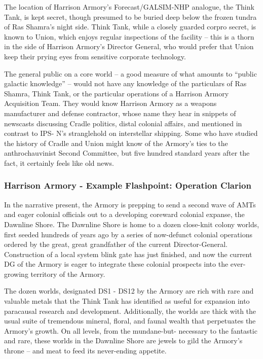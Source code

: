 The location of Harrison Armory’s Forecast/GALSIM-NHP analogue, the Think Tank, is kept
secret, though presumed to be buried deep below the frozen tundra of Ras Shamra’s night side.
Think Tank, while a closely guarded corpro secret, is known to Union, which enjoys regular
inspections of the facility -- this is a thorn in the side of Harrison Armory’s Director General, who
would prefer that Union keep their prying eyes from sensitive corporate technology.

The general public on a core world -- a good measure of what amounts to “public galactic
knowledge” -- would not have any knowledge of the particulars of Ras Shamra, Think Tank, or
the particular operations of a Harrison Armory Acquisition Team. They would know Harrison
Armory as a weapons manufacturer and defense contractor, whose name they hear in snippets
of newscasts discussing Cradle politics, distal colonial affairs, and mentioned in contrast to IPS-
N’s stranglehold on interstellar shipping. Some who have studied the history of Cradle and Union
might know of the Armory’s ties to the anthrochauvinist Second Committee, but five hundred
standard years after the fact, it certainly feels like old news.

\subsubsection[Example Flashpoint: Operation Clarion]{Harrison Armory - Example Flashpoint: Operation Clarion  }

In the narrative present, the Armory is prepping to send a second wave of AMTs and eager
colonial officials out to a developing coreward colonial expanse, the Dawnline Shore. The
Dawnline Shore is home to a dozen close-knit colony worlds, first seeded hundreds of years ago
by a series of now-defunct colonial operations ordered by the great, great grandfather of the
current Director-General. Construction of a local system blink gate has just finished, and now the
current DG of the Armory is eager to integrate these colonial prospects into the ever-growing
territory of the Armory.

The dozen worlds, designated DS1 - DS12 by the Armory are rich with rare and valuable metals
that the Think Tank has identified as useful for expansion into paracausal research and
development. Additionally, the worlds are thick with the usual suite of tremendous mineral, floral,
and faunal wealth that perpetuates the Armory’s growth. On all levels, from the mundane-but-
necessary to the fantastic and rare, these worlds in the Dawnline Shore are jewels to gild the
Armory’s throne -- and meat to feed its never-ending appetite.


